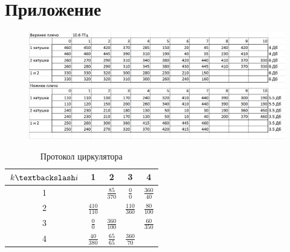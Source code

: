 \newpage
\section{Приложение}
\begin{figure}[H]
    \centering
    \includegraphics[width = 1\linewidth]{imgs/temp/005.png}
    \label{fig:5}
\end{figure}

\begin{center}
\end{center}
\begin{table}[h!]
    \centering
    \bgroup
    \def\arraystretch{1.2}
    \begin{tabular}{|c|c|c|c|c|}
    \hline
     $k \textbackslash i$ & 1 & 2 & 3 & 4 \\ \hline
    1 & \cellcolor{black!70}  & $\frac{85}{370}$ & $\frac{0}{0}$& $\frac{360}{40}$  \\ \hline
    2 & $\frac{410}{110}$  &\cellcolor{black!70}   & $\frac{110}{360}$  & $\frac{80}{100}$  \\ \hline
    3 & $\frac{0}{0}$  & $\frac{360}{100}$  & \cellcolor{black!70}  &  $\frac{60}{350}$ \\ \hline
    4 & $\frac{40}{380}$  & $\frac{65}{65}$  & $\frac{360}{70}$  & \cellcolor{black!70} \\ \hline
    \end{tabular}
    \egroup
    \caption{Протокол циркулятора}
    \label{tab:phaser}
    \end{table}


